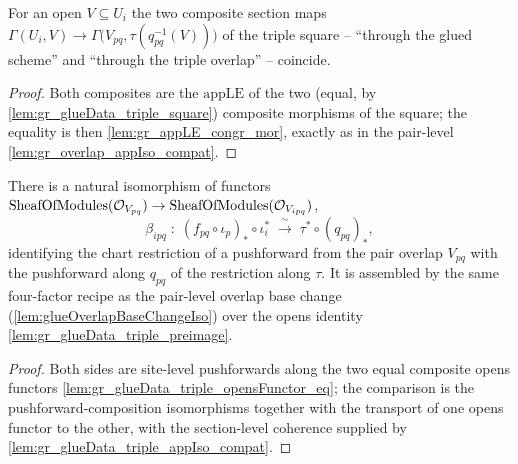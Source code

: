 \begin{lemma}

  \label{lem:gr_glueData_triple_appIso_compat}
  For an open \(V \subseteq U_i\) the two composite section maps
  \(\Gamma(U_i, V) \to \Gamma\bigl(V_{pq}, \tau(q_{pq}^{-1}(V))\bigr)\) of the triple
  square -- ``through the glued scheme'' and ``through the triple overlap'' -- coincide.
\end{lemma}
\begin{proof}
  \leanok
  Both composites are the \(\mathrm{appLE}\) of the two (equal, by
  \cref{lem:gr_glueData_triple_square}) composite morphisms of the square; the equality
  is then \cref{lem:gr_appLE_congr_mor}, exactly as in the pair-level
  \cref{lem:gr_overlap_appIso_compat}.
\end{proof}

\begin{lemma}

  \label{lem:gr_glueTripleBaseChangeIso}
  There is a natural isomorphism of functors
  \(\mathrm{SheafOfModules}(\mathcal{O}_{V_{pq}}) \to \mathrm{SheafOfModules}(\mathcal{O}_{V_{ipq}})\),
  \[
    \beta_{ipq} \;:\;
      (f_{pq}\circ\iota_p)_{*}\circ \iota_i^{*}
        \;\xrightarrow{\ \sim\ }\;
      \tau^{*}\circ (q_{pq})_{*},
  \]
  identifying the chart restriction of a pushforward from the pair overlap \(V_{pq}\)
  with the pushforward along \(q_{pq}\) of the restriction along \(\tau\). It is
  assembled by the same four-factor recipe as the pair-level overlap base change
  (\cref{lem:glueOverlapBaseChangeIso}) over the opens identity
  \cref{lem:gr_glueData_triple_preimage}.
\end{lemma}
\begin{proof}
    \leanok
  Both sides are site-level pushforwards along the two equal composite opens functors
  \cref{lem:gr_glueData_triple_opensFunctor_eq}; the comparison is the pushforward-com\-position
  isomorphisms together with the transport of one opens functor to the other, with the
  section-level coherence supplied by \cref{lem:gr_glueData_triple_appIso_compat}.
\end{proof}

